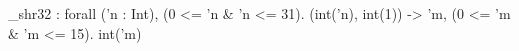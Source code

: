 _shr32 : forall ('n : Int), (0 <= 'n & 'n <= 31). (int('n), int(1)) -> {'m, (0 <= 'm & 'm <= 15). int('m)}